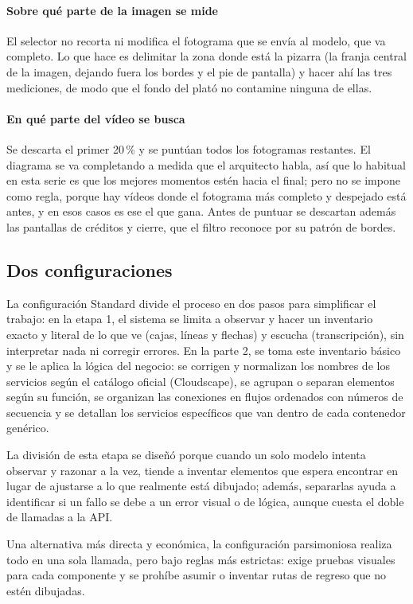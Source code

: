 \documentclass[a4paper, twocolumn, 10pt]{IEEEtran}
\begin{document}
\paragraph{Sobre qué parte de la imagen se mide} El selector no recorta ni modifica el fotograma que se envía al modelo, que va completo. Lo que hace es delimitar la zona donde está la pizarra (la franja central de la imagen, dejando fuera los bordes y el pie de pantalla) y hacer ahí las tres mediciones, de modo que el fondo del plató no contamine ninguna de ellas. 
 
\paragraph{En qué parte del vídeo se busca} Se descarta el primer 20\,\% y se puntúan todos los fotogramas restantes. El diagrama se va completando a medida que el arquitecto habla, así que lo habitual en esta serie es que los mejores momentos estén hacia el final; pero no se impone como regla, porque hay vídeos donde el fotograma más completo y despejado está antes, y en esos casos es ese el que gana. Antes de puntuar se descartan además las pantallas de créditos y cierre, que el filtro reconoce por su patrón de bordes.
 
\subsection{Dos configuraciones}
La configuración Standard divide el proceso en dos pasos para simplificar el trabajo: en la etapa 1, el sistema se limita a observar y hacer un inventario exacto y literal de lo que ve (cajas, líneas y flechas) y escucha (transcripción), sin interpretar nada ni corregir errores. En la parte 2, se toma este inventario básico y se le aplica la lógica del negocio: se corrigen y normalizan los nombres de los servicios según el catálogo oficial (Cloudscape), se agrupan o separan elementos según su función, se organizan las conexiones en flujos ordenados con números de secuencia y se detallan los servicios específicos que van dentro de cada contenedor genérico.
 
La división de esta etapa se diseñó porque cuando un solo modelo intenta observar y razonar a la vez, tiende a inventar elementos que espera encontrar en lugar de ajustarse a lo que realmente está dibujado; además, separarlas ayuda a identificar si un fallo se debe a un error visual o de lógica, aunque cuesta el doble de llamadas a la API. 
 
Una alternativa más directa y económica, la configuración parsimoniosa realiza todo en una sola llamada, pero bajo reglas más estrictas: exige pruebas visuales para cada componente y se prohíbe asumir o inventar rutas de regreso que no estén dibujadas.
 
\end{document}
